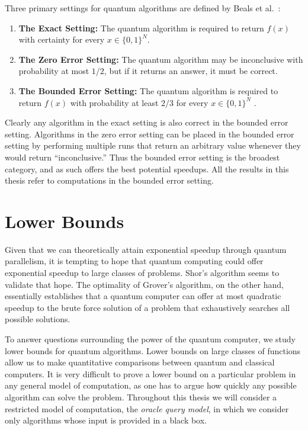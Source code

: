 Three primary settings for quantum algorithms are defined by Beals et
al.\ \cite{beals98quantum}:
\begin{enumerate}

\item \textbf{The Exact Setting:} 
The quantum algorithm is required to return $f(x)$ with certainty for
every $x \in \{0,1\}^{N}$.

\item \textbf{The Zero Error Setting:}
The quantum algorithm may be inconclusive with probability at most
$1/2$, but if it returns an answer, it must be correct.

\item \textbf{The Bounded Error Setting:}
The quantum algorithm is required to return $f(x)$ with probability at
least $2/3$ for every $x \in \{0,1\}^{N}$ .
\end{enumerate}

Clearly any algorithm in the exact setting is also correct in the
bounded error setting.  Algorithms in the zero error setting can be
placed in the bounded error setting by performing multiple runs that
return an arbitrary value whenever they would return ``inconclusive.''
Thus the bounded error setting is the broadest category, and as such
offers the best potential speedups.  All the results in this thesis
refer to computations in the bounded error setting.

\section{Lower Bounds}
\label{sec:lower}

Given that we can theoretically attain exponential speedup through
quantum parallelism, it is tempting to hope that quantum computing
could offer exponential speedup to large classes of problems.  Shor's
algorithm seems to validate that hope.  The optimality of Grover's
algorithm, on the other hand, essentially establishes that a quantum
computer can offer at most quadratic speedup to the brute force
solution of a problem that exhaustively searches all possible
solutions.

To answer questions surrounding the power of the quantum computer, we
study lower bounds for quantum algorithms.  Lower bounds on large
classes of functions allow us to make quantitative comparisons between
quantum and classical computers.  It is very difficult to prove a
lower bound on a particular problem in any general model of
computation, as one has to argue how quickly any possible algorithm
can solve the problem.  Throughout this thesis we will consider a
restricted model of computation, the \emph{oracle query model}, in
which we consider only algorithms whose input is provided in a black
box.

